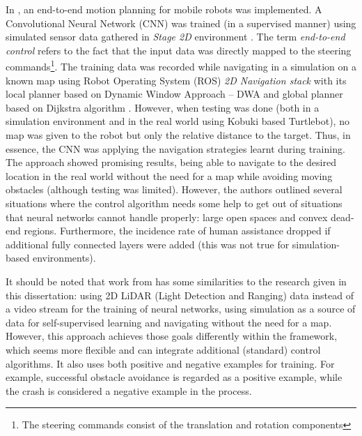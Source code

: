 In \cite{Pfeiffer2017}, an end-to-end motion planning for mobile robots was implemented. A Convolutional Neural Network (CNN) was trained (in a supervised manner) using simulated sensor data gathered in \emph{Stage 2D} environment \cite{Vaughan2008}. The term \emph{end-to-end control} refers to the fact that the input data was directly mapped to the steering commands\footnote{The steering commands consist of the translation and rotation components}. The training data was recorded while navigating in a simulation on a known map using Robot Operating System (ROS) \cite{Quigley2009} \emph{2D Navigation stack} with its local planner based on Dynamic Window Approach -- DWA \cite{Fox1997} and global planner based on Dijkstra algorithm \cite{Dijkstra1959}. However, when testing was done (both in a simulation environment and in the real world using Kobuki based Turtlebot), no map was given to the robot but only the relative distance to the target. Thus, in essence, the CNN was applying the navigation strategies learnt during training. The approach showed promising results, being able to navigate to the desired location in the real world without the need for a map while avoiding moving obstacles (although testing was limited). However, the authors outlined several situations where the control algorithm needs some help to get out of situations that neural networks cannot handle properly: large open spaces and convex dead-end regions. Furthermore, the incidence rate of human assistance dropped if additional fully connected layers were added (this was not true for simulation-based environments).

It should be noted that work from \cite{Pfeiffer2017} has some similarities to the research given in this dissertation: using 2D LiDAR (Light Detection and Ranging) data instead of a video stream for the training of neural networks, using simulation as a source of data for self-supervised learning and navigating without the need for a map. However, this approach achieves those goals differently within the framework, which seems more flexible and can integrate additional (standard) control algorithms. It also uses both positive and negative examples for training. For example, successful obstacle avoidance is regarded as a positive example, while the crash is considered a negative example in the process.

